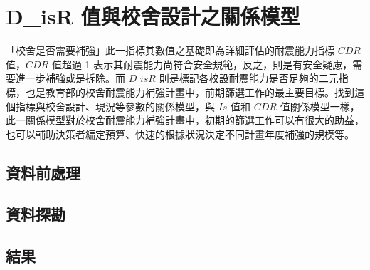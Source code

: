 \section{D\_isR 值與校舍設計之關係模型}

「校舍是否需要補強」此一指標其數值之基礎即為詳細評估的耐震能力指標 $CDR$ 值，$CDR$ 值超過 1 表示其耐震能力尚符合安全規範，反之，則是有安全疑慮，需要進一步補強或是拆除。而 $D\_isR$ 則是標記各校設耐震能力是否足夠的二元指標，也是教育部的校舍耐震能力補強計畫中，前期篩選工作的最主要目標。找到這個指標與校舍設計、現況等參數的關係模型，與 $Is$ 值和 $CDR$ 值關係模型一樣，此一關係模型對於校舍耐震能力補強計畫中，初期的篩選工作可以有很大的助益，也可以輔助決策者編定預算、快速的根據狀況決定不同計畫年度補強的規模等。

\subsection{資料前處理}
\subsection{資料探勘}
\subsection{結果}

